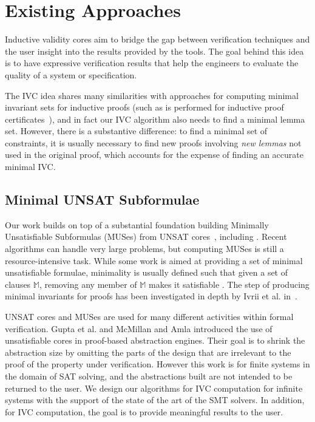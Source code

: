 \chapter{Existing Approaches}
\label{sec:relatedWork}
Inductive validity cores aim to bridge the gap between verification techniques and the user insight into the results provided by the tools. The goal behind this idea is to have expressive verification results that help the engineers to evaluate the quality of a system or specification.

The IVC idea shares many similarities with approaches for computing minimal invariant sets for inductive proofs (such as is performed for inductive proof certificates~\cite{piskac2016, Ivrii14:invariants}), and in fact our IVC algorithm also needs to find a minimal lemma set.  However, there is a substantive difference: to find a minimal set of constraints, it is usually necessary to find new proofs involving {\em new lemmas} not used in the original proof, which accounts for the expense of finding an accurate minimal IVC.

\section{Minimal UNSAT Subformulae}
Our work builds on top of a substantial foundation building Minimally Unsatisfiable Subformulas
(MUSes) from UNSAT cores~\cite{Cimatti2007:UNSAT}, including \cite{marques2010minimal, belov2012towards, ryvchin2011faster, belov2012computing, nadel2010boosting}.  Recent algorithms can handle very large problems, but computing MUSes is still a resource-intensive task.  While some work is aimed at providing a set of minimal unsatisfiable formulae, minimality is usually defined such that given a set of clauses $\mathbb{M}$, removing any member of $\mathbb{M}$ makes it satisfiable \cite{belov2012computing}.  The step of producing minimal invariants for proofs has been investigated in depth by Ivrii et al. in~\cite{Ivrii14:invariants}.

UNSAT cores and MUSes are used for many different activities within
formal verification. Gupta et al. \cite{gupta2003iterative} and
McMillan and Amla \cite{mcmillan2003automatic} introduced the use of
unsatisfiable cores in proof-based abstraction engines. Their goal is
to shrink the abstraction size by omitting the parts of the design
that are irrelevant to the proof of the property under verification.
However this work is for finite systems in the domain of SAT solving,
 and the abstractions built are not intended to be returned to the user.
 We design our algorithms for IVC computation for
 infinite systems with the support of the state of the art of the SMT solvers. In addition, for IVC computation, the goal is to provide meaningful results to the user.

